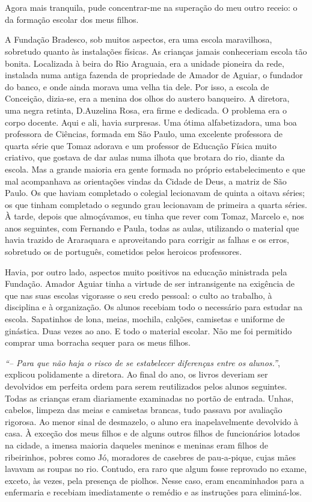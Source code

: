 \chapter{}
Agora mais tranquila, pude concentrar-me na superação do meu outro receio: o da formação escolar dos meus filhos.


A Fundação Bradesco, sob muitos aspectos, era uma escola maravilhosa, sobretudo quanto às instalações físicas.
As crianças jamais conheceriam escola tão bonita.
Localizada à beira do Rio Araguaia, era a unidade pioneira da rede, instalada numa antiga fazenda de propriedade de Amador de Aguiar, o fundador do banco, e onde ainda morava uma velha tia dele.
Por isso, a escola de Conceição, dizia-se, era a menina dos olhos do austero banqueiro.
A diretora, uma negra retinta, D.Auzelina Rosa, era firme e dedicada.
O problema era o corpo docente.
Aqui e ali, havia surpresas.
Uma ótima alfabetizadora, uma boa professora de Ciências, formada em São Paulo, uma excelente professora de quarta série que Tomaz adorava e um professor de Educação Física muito criativo, que gostava de dar aulas numa ilhota que brotara do rio, diante da escola.
Mas a grande maioria era gente formada no próprio estabelecimento e que mal acompanhava as orientações vindas da Cidade de Deus, a matriz de São Paulo.
Os que haviam completado o colegial lecionavam de quinta a oitava séries; os que tinham completado o segundo grau lecionavam de primeira a quarta séries.
À tarde, depois que almoçávamos, eu tinha que rever com Tomaz, Marcelo e, nos anos seguintes, com Fernando e Paula, todas as aulas, utilizando o material que havia trazido de Araraquara e aproveitando para corrigir as falhas e os erros, sobretudo os de português, cometidos pelos heroicos professores.

Havia, por outro lado, aspectos muito positivos na educação ministrada pela Fundação.
Amador Aguiar tinha a virtude de ser intransigente na exigência de que nas suas escolas vigorasse o seu credo pessoal: o culto ao trabalho, à disciplina e à organização.
Os alunos recebiam todo o necessário para estudar na escola.
Sapatinhos de lona, meias, mochila, calções, camisetas e uniforme de ginástica.
Duas vezes ao ano.
E todo o material escolar.
Não me foi permitido comprar uma borracha sequer para os meus filhos.

\textit{``-- Para que não haja o risco de se estabelecer diferenças entre os alunos.''}, explicou polidamente a diretora.
Ao final do ano, os livros deveriam ser devolvidos em perfeita ordem para serem reutilizados pelos alunos seguintes.
Todas as crianças eram diariamente examinadas no portão de entrada.
Unhas, cabelos, limpeza das meias e camisetas brancas, tudo passava por avaliação rigorosa.
Ao menor sinal de desmazelo, o aluno era inapelavelmente devolvido à casa.
À exceção dos meus filhos e de alguns outros filhos de funcionários lotados na cidade, a imensa maioria daqueles meninos e meninas eram filhos de ribeirinhos, pobres como Jó, moradores de casebres de pau-a-pique, cujas mães lavavam as roupas no rio.
Contudo, era raro que algum fosse reprovado no exame, exceto, às vezes, pela presença de piolhos.
Nesse caso, eram encaminhados para a enfermaria e recebiam imediatamente o remédio e as instruções para eliminá-los.

